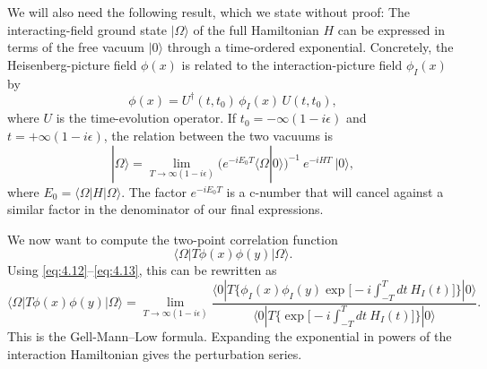 We will also need the following result, which we state without proof: The
interacting-field ground state $|\Omega\rangle$ of the full Hamiltonian $H$
can be expressed in terms of the free vacuum $|0\rangle$ through a
time-ordered exponential.  Concretely, the Heisenberg-picture field $\phi(x)$
is related to the interaction-picture field $\phi_I(x)$ by
\begin{equation}
  \phi(x) = U^{\dagger}(t, t_0)\,\phi_I(x)\,U(t, t_0),
  \label{eq:4.12}
\end{equation}
where $U$ is the time-evolution operator.  If $t_0 = -\infty(1-i\epsilon)$
and $t = +\infty(1-i\epsilon)$, the relation between the two vacuums is
\begin{equation}
  |\Omega\rangle = \lim_{T\to\infty(1-i\epsilon)}
    \bigl( e^{-iE_0T}\langle\Omega|0\rangle \bigr)^{-1}\ e^{-iHT}\ |0\rangle ,
  \label{eq:4.13}
\end{equation}
where $E_0 = \langle\Omega|H|\Omega\rangle$.  The factor $e^{-iE_0T}$ is a
c-number that will cancel against a similar factor in the denominator of our
final expressions.

We now want to compute the two-point correlation function
\begin{equation}
  \langle\Omega|T\phi(x)\phi(y)|\Omega\rangle .
  \label{eq:4.14}
\end{equation}
Using \eqref{eq:4.12}--\eqref{eq:4.13}, this can be rewritten as
\begin{equation}
  \langle\Omega|T\phi(x)\phi(y)|\Omega\rangle
  = \lim_{T\to\infty(1-i\epsilon)}
    \frac{\langle 0|T\bigl\{ \phi_I(x)\phi_I(y)
      \exp\bigl[-i\int_{-T}^{T}dt\ H_I(t)\bigr]\bigr\}|0\rangle}
      {\langle 0|T\bigl\{ \exp\bigl[-i\int_{-T}^{T}dt\ H_I(t)\bigr]\bigr\}|0\rangle} .
  \label{eq:4.15}
\end{equation}
This is the Gell-Mann--Low formula.  Expanding the exponential in powers of
the interaction Hamiltonian gives the perturbation series.

